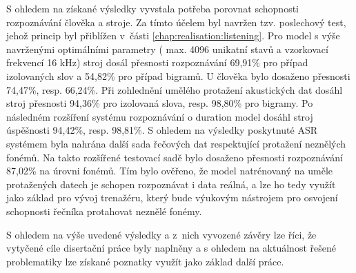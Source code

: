 S ohledem na získané výsledky vyvstala potřeba porovnat schopnosti rozpoznávání člověka a stroje. Za tímto účelem byl navržen tzv. poslechový test, jehož princip byl přiblížen v~části \ref{chap:realisation:listening}. Pro model s výše navrženými optimálními parametry ( max. 4096 unikatní stavů a vzorkovací frekvencí 16 kHz) stroj dosál přesnosti rozpoznávání  69,91\% pro případ izolovaných slov a 54,82\% pro případ bigramů. U člověka bylo dosaženo přesnosti 74,47\%, resp. 66,24\%. Při zohlednění umělého protažení akustických dat dosáhl stroj přesnosti 94,36\% pro izolovaná slova, resp. 98,80\% pro bigramy. Po následném rozšíření systému rozpoznávání o duration model dosáhl stroj úspěšnosti 94,42\%, resp. 98,81\%. S ohledem na výsledky poskytnuté ASR systémem byla nahrána další sada řečových dat respektující protažení neznělých fonémů. Na takto rozšířené testovací sadě bylo dosaženo přesnosti rozpoznávání 87,02\% na úrovni fonémů. Tím bylo ověřeno, že model natrénovaný na uměle protažených datech je schopen rozpoznávat i data reálná, a lze ho tedy využít jako základ pro vývoj trenažéru, který bude výukovým nástrojem pro osvojení schopnosti řečníka protahovat neznělé fonémy.

S ohledem na výše uvedené výsledky a z~nich vyvozené závěry lze říci, že vytyčené cíle disertační práce byly naplněny a s ohledem na aktuálnost řešené problematiky lze získané poznatky využít jako základ další práce.










